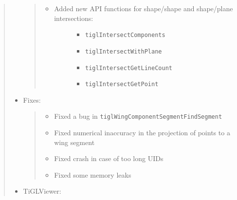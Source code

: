 \documentclass[]{scrartcl}
\begin{document}
\begin{quote}
\begin{itemize}
  \begin{quote}
  \begin{itemize}
  \item
    \begin{description}
    \item[Added new API functions for shape/shape and shape/plane
    intersections:]
    \begin{itemize}
    \itemsep1pt\parskip0pt
    \item
      \texttt{tiglIntersectComponents}
    \item
      \texttt{tiglIntersectWithPlane}
    \item
      \texttt{tiglIntersectGetLineCount}
    \item
      \texttt{tiglIntersectGetPoint}
    \end{itemize}
    \end{description}
  \end{itemize}
  \end{quote}
\item
  Fixes:

  \begin{quote}
  \begin{itemize}
  \itemsep1pt\parskip0pt
  \item
    Fixed a bug in \texttt{tiglWingComponentSegmentFindSegment}
  \item
    Fixed numerical inaccuracy in the projection of points to a wing
    segment
  \item
    Fixed crash in case of too long UIDs
  \item
    Fixed some memory leaks
  \end{itemize}
  \end{quote}
\item
  TiGLViewer:


\end{itemize}
\end{quote}
\end{document}
